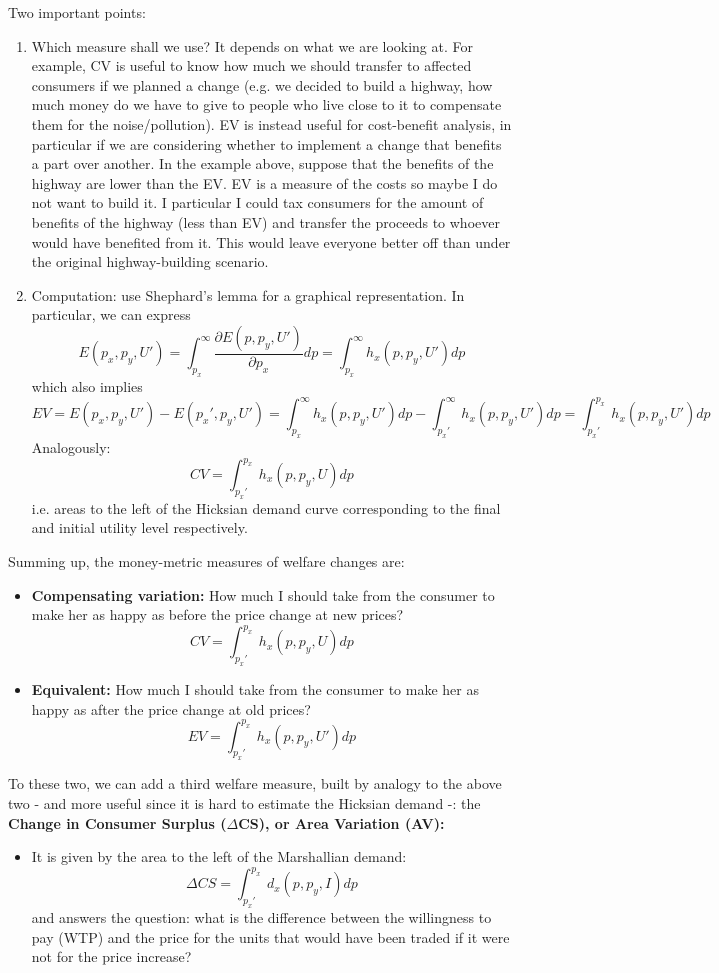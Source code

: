 \documentclass[11pt,english]{article}
\begin{document}
Two important points:
\begin{enumerate}
\item Which measure shall we use? It depends on what we are looking at.
For example, CV is useful to know how much we should transfer to affected
consumers if we planned a change (e.g. we decided to build a highway,
how much money do we have to give to people who live close to it to
compensate them for the noise/pollution). EV is instead useful for
cost-benefit analysis, in particular if we are considering whether
to implement a change that benefits a part over another. In the example
above, suppose that the benefits of the highway are lower than the
EV. EV is a measure of the costs so maybe I do not want to build it. I particular I could tax consumers for the amount of benefits of the highway (less than EV) and transfer the proceeds to whoever would have benefited from it. This would leave everyone better off than under the original highway-building scenario.
\item Computation: use Shephard's lemma for a graphical representation.
In particular, we can express
\[
E\left(p_{x},p_{y},U'\right)=\int_{p_{x}}^{\infty}\frac{\partial E\left(p,p_{y},U'\right)}{\partial p_{x}}dp=\int_{p_{x}}^{\infty}h_{x}(p,p_{y},U')dp
\]
which also implies
\[
EV=E\left(p_{x},p_{y},U'\right)-E\left(p_{x}',p_{y},U'\right)=\int_{p_{x}}^{\infty}h_{x}(p,p_{y},U')dp-\int_{p_{x}'}^{\infty}h_{x}(p,p_{y},U')dp=\int_{p_{x}'}^{p_{x}}h_{x}(p,p_{y},U')dp
\]
Analogously:
\[
CV=\int_{p_{x}'}^{p_{x}}h_{x}(p,p_{y},U)dp
\]
i.e. areas to the left of the Hicksian demand curve corresponding
to the final and initial utility level respectively. 
\end{enumerate}
Summing up, the money-metric measures of welfare changes are:
\begin{itemize}
\item \textbf{Compensating variation: }How much I should take from the consumer
to make her as happy as before the price change at new prices? 
\[
CV=\int_{p_{x}'}^{p_{x}}h_{x}(p,p_{y},U)dp
\]
\item \textbf{Equivalent: }How much I should take from the consumer to make
her as happy as after the price change at old prices? 
\[
EV=\int_{p_{x}'}^{p_{x}}h_{x}(p,p_{y},U')dp
\]
\end{itemize}
To these two, we can add a third welfare measure, built by analogy
to the above two - and more useful since it is hard to estimate the
Hicksian demand -: the \textbf{Change in Consumer Surplus ($\Delta$CS),
or Area Variation (AV):}
\begin{itemize}
\item It is given by the area to the left of the Marshallian demand:
\[
\Delta CS=\int_{p_{x}'}^{p_{x}}d_{x}(p,p_{y},I)dp
\]
and answers the question: what is the difference between the willingness
to pay (WTP) and the price for the units that would have been traded
if it were not for the price increase?
\end{itemize}
\end{document}
